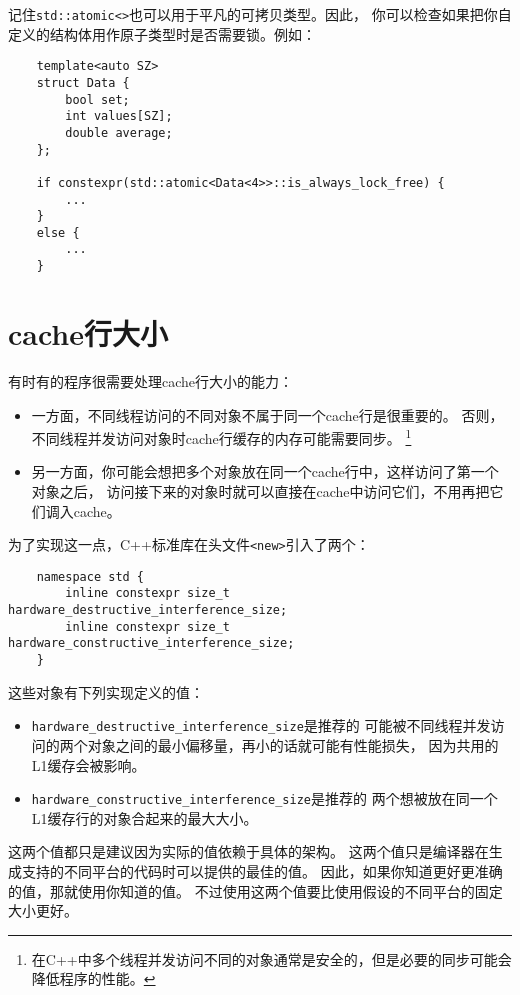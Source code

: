 记住\texttt{std::atomic<>}也可以用于平凡的可拷贝类型。因此，
你可以检查如果把你自定义的结构体用作原子类型时是否需要锁。例如：
\begin{lstlisting}
    template<auto SZ>
    struct Data {
        bool set;
        int values[SZ];
        double average;
    };

    if constexpr(std::atomic<Data<4>>::is_always_lock_free) {
        ...
    }
    else {
        ...
    }
\end{lstlisting}


\section{cache行大小}
有时有的程序很需要处理cache行大小的能力：
\begin{itemize}
    \item 一方面，不同线程访问的不同对象不属于同一个cache行是很重要的。
    否则，不同线程并发访问对象时cache行缓存的内存可能需要同步。
    \footnote{在C++中多个线程并发访问不同的对象通常是安全的，但是必要的同步可能会降低程序的性能。}
    \item 另一方面，你可能会想把多个对象放在同一个cache行中，这样访问了第一个对象之后，
    访问接下来的对象时就可以直接在cache中访问它们，不用再把它们调入cache。
\end{itemize}
为了实现这一点，C++标准库在头文件\texttt{<new>}引入了两个：
\begin{lstlisting}
    namespace std {
        inline constexpr size_t hardware_destructive_interference_size;
        inline constexpr size_t hardware_constructive_interference_size;
    }
\end{lstlisting}
这些对象有下列实现定义的值：
\begin{itemize}
    \item \texttt{hardware\_destructive\_interference\_size}是推荐的
    可能被不同线程并发访问的两个对象之间的最小偏移量，再小的话就可能有性能损失，
    因为共用的L1缓存会被影响。
    \item \texttt{hardware\_constructive\_interference\_size}是推荐的
    两个想被放在同一个L1缓存行的对象合起来的最大大小。
\end{itemize}
这两个值都只是建议因为实际的值依赖于具体的架构。
这两个值只是编译器在生成支持的不同平台的代码时可以提供的最佳的值。
因此，如果你知道更好更准确的值，那就使用你知道的值。
不过使用这两个值要比使用假设的不同平台的固定大小更好。

